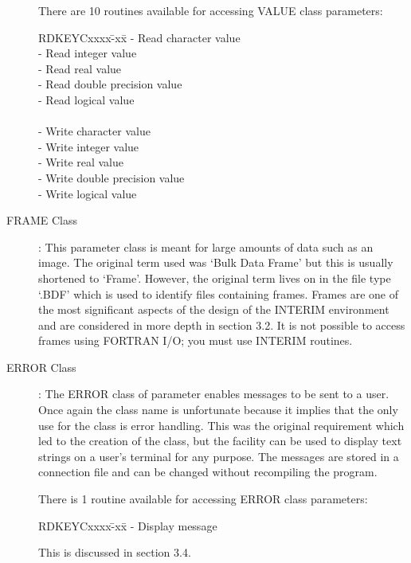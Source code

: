 \documentclass{article}
\begin{document}
\begin{description}
There are 10 routines available for accessing VALUE class parameters:
\begin{tabbing}
\hspace{31mm}RDKEYCxxxx\=-xx\=\kill
\hspace{31mm}{\bf RDKEYC} \>- \>Read character value\\
\hspace{31mm}{\bf RDKEYI} \>- \>Read integer value\\
\hspace{31mm}{\bf RDKEYR} \>- \>Read real value\\
\hspace{31mm}{\bf RDKEYD} \>- \>Read double precision value\\
\hspace{31mm}{\bf RDKEYL} \>- \>Read logical value\\
\\
\hspace{31mm}{\bf WRKEYC} \>- \>Write character value\\
\hspace{31mm}{\bf WRKEYI} \>- \>Write integer value\\
\hspace{31mm}{\bf WRKEYR} \>- \>Write real value\\
\hspace{31mm}{\bf WRKEYD} \>- \>Write double precision value\\
\hspace{31mm}{\bf WRKEYL} \>- \>Write logical value
\end{tabbing}
\item [FRAME Class]:
This parameter class is meant for large amounts of data such as an image.
The original term used was `Bulk Data Frame' but this is usually shortened to
`Frame'.
However, the original term lives on in the file type `.BDF' which is used to
identify files containing frames.
Frames are one of the most significant aspects of the design of the INTERIM
environment and are considered in more depth in section 3.2.
It is not possible to access frames using FORTRAN I/O; you must use INTERIM
routines.
\item [ERROR Class]:
The ERROR class of parameter enables messages to be sent to a user.
Once again the class name is unfortunate because it implies that the only
use for the class is error handling.
This was the original requirement which led to the creation of the class,
but the facility can be used to display text strings on a user's terminal
for any purpose.
The messages are stored in a connection file and can be changed without
recompiling the program.

There is 1 routine available for accessing ERROR class parameters:
\begin{tabbing}
\hspace{31mm}RDKEYCxxxx\=-xx\=\kill
\hspace{31mm}{\bf WRERR} \>- \>Display message
\end{tabbing}
This is discussed in section 3.4.
\end{description}
\end{document}
